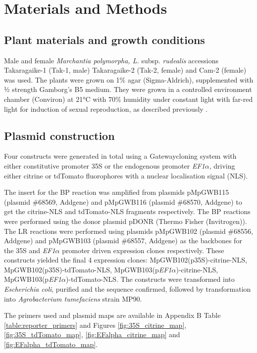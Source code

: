 \clearpage

\section{Materials and Methods}

\subsection{Plant materials and growth conditions}

Male and female \textit{Marchantia polymorpha, L.} subsp. \textit{rudealis} accessions Takaragaike-1 (Tak-1, male) Takaragaike-2 (Tak-2, female) and Cam-2 (female) was used. The plants were grown on 1\% agar (Sigma-Aldrich), supplemented with ½ strength Gamborg's B5 medium. They were grown in a controlled environment chamber (Conviron) at 21°C with 70\% humidity under constant light with far-red light for induction of sexual reproduction, as described previously \cite{RN212,RN254}.

\subsection{Plasmid construction}

Four constructs were generated in total  using a Gateway\textregistered cloning system with either constitutive promoter 35S or the endogenous promoter \textit{EF1$\alpha$}, driving either citrine or tdTomato fluorophores with a nuclear localisation signal (NLS).

The insert for the BP reaction was amplified from plasmids pMpGWB115 (plasmid \#68569, Addgene) and pMpGWB116 (plasmid \#68570, Addgene) \cite{RN72} to get the citrine-NLS and tdTomato-NLS fragments respectively. The BP reactions were performed using the donor plasmid pDONR (Thermo Fisher (Invitrogen)). The LR reactions were performed using plasmids pMpGWB102 (plasmid \#68556, Addgene) and pMpGWB103 (plasmid \#68557, Addgene)\cite{RN72} as the backbones for the 35S and \textit{EF1$\alpha$} promoter driven expression clones respectively. These constructs yielded the final 4 expression clones: MpGWB102(p35S)-citrine-NLS, MpGWB102(p35S)-tdTomato-NLS, MpGWB103(p\textit{EF1$\alpha$})-citrine-NLS, MpGWB103(p\textit{EF1$\alpha$})-tdTomato-NLS. The constructs were transformed into \textit{Escherichia  coli}, purified and the sequence confirmed, followed by transformation into \textit{Agrobacterium tumefaciens} strain MP90.

The primers used and plasmid maps are available in Appendix B Table \ref{table:reporter_primers} and Figures \ref{fig:35S_citrine_map}, \ref{fig:35S_tdTomato_map}, \ref{fig:EFalpha_citrine_map} and \ref{fig:EFalpha_tdTomato_map}.

